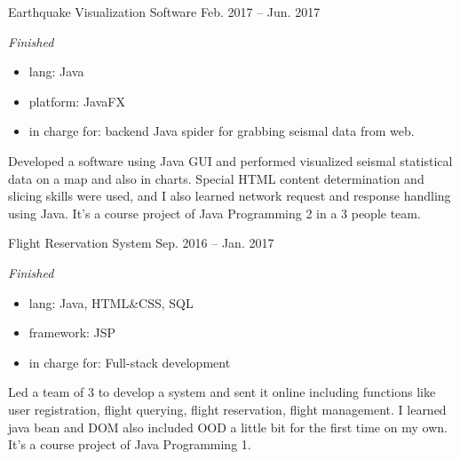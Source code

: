 \documentclass[hidelinks__VERSION__]{adamyi-cv}
\begin{document}
\begin{entrylist}

\entry
{Earthquake Visualization Software}
{Feb. 2017 -- Jun. 2017}
{\emph{Finished}
\begin{itemize}
    \item lang: Java
    \item platform: JavaFX
    \item in charge for: backend Java spider for grabbing seismal data from web.
\end{itemize}
Developed a software using Java GUI and performed visualized seismal statistical data on a map and also in charts. Special HTML content determination and slicing skills were used, and I also learned network request and response handling using Java. It's a course project of Java Programming 2 in a 3 people team.
}


\entry
{Flight Reservation System}
{Sep. 2016 -- Jan. 2017}
{\emph{Finished}
\begin{itemize}
    \item lang: Java, HTML\&CSS, SQL
    \item framework: JSP
    \item in charge for: Full-stack development
\end{itemize}
Led a team of 3 to develop a system and sent it online including functions like user registration, flight querying, flight reservation, flight management. I learned java bean and DOM also included OOD a little bit for the first time on my own. It's a course project of Java Programming 1.
}


\end{entrylist}
\end{document}
